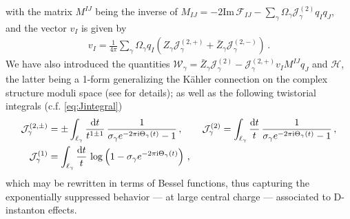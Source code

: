 %
with the matrix $M^{IJ}$ being the inverse of $M_{IJ}=-2\text{Im}\, \mathcal{F}_{IJ} - \sum_{\gamma} \Omega_{\gamma} \mathcal{J}_{\gamma}^{(2)} q_I q_J$, and the vector $v_I$ is given by
%
\begin{align}
	v_I=\frac{1}{4\pi} \sum_{\gamma} \Omega_{\gamma} q_I \left( Z_{\gamma} \mathcal{J}_{\gamma}^{(2, +)} + \bar{Z}_{\gamma} \mathcal{J}_{\gamma}^{(2, -)}\right)\, .
\end{align}
%
We have also introduced the quantities $\mathcal{W}_{\gamma}=\bar{Z}_{\gamma} \mathcal{J}_{\gamma}^{(2)}- \mathcal{J}_{\gamma}^{(2, +)}v_I M^{IJ} q_J$ and $\mathcal{H}$, the latter being a 1-form generalizing the K\"ahler connection on the complex structure moduli space (see \cite{Alexandrov:2014sya} for details); as well as the following twistorial integrals (c.f. \eqref{eq:Jintegral}) 
%
\begin{align}\label{eq:JintegralII}
	\mathcal{J}_{\gamma}^{(2, \pm)}&= \pm \int_{\ell_{\gamma}} \frac{{\rm d} t}{t^{1 \pm 1}}\, \frac{1}{\sigma_{\gamma} e^{-2\pi \text{i} \Theta_{\gamma}(t)}-1}\, , \qquad \mathcal{J}_{\gamma}^{(2)}= \int_{\ell_{\gamma}} \frac{{\rm d} t}{t}\, \frac{1}{\sigma_{\gamma} e^{-2\pi \text{i} \Theta_{\gamma}(t)}-1}\, , \notag\\
	\mathcal{J}_{\gamma}^{(1)}&= \int_{\ell_{\gamma}} \frac{{\rm d} t}{t}\, \log\left(1-\sigma_{\gamma} e^{-2\pi \text{i} \Theta_{\gamma}(t)} \right)\, ,
\end{align}
%
which may be rewritten in terms of Bessel functions, thus capturing the exponentially suppressed behavior --- at large central charge --- associated to D-instanton effects.
	
